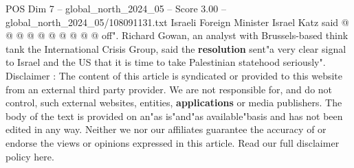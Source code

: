\begin{textsample}{POS Dim 7 – global\_north\_2024\_05 – Score 3.00 – global\_north\_2024\_05/108091131.txt}
Israeli Foreign Minister Israel Katz said @ @ @ @ @ @ @ @ @ @ off".
Richard Gowan, an analyst with Brussels-based think tank the International Crisis Group, said the \textbf{resolution} sent"a very clear signal to Israel and the US that it is time to take Palestinian statehood seriously".
Disclaimer : The content of this article is syndicated or provided to this website from an external third party provider.
We are not responsible for, and do not control, such external websites, entities, \textbf{applications} or media publishers.
The body of the text is provided on an"as is"and"as available"basis and has not been edited in any way.
Neither we nor our affiliates guarantee the accuracy of or endorse the views or opinions expressed in this article.
Read our full disclaimer policy here.

\end{textsample}
